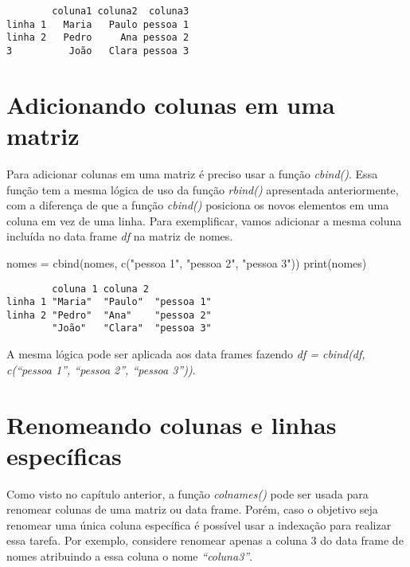 \documentclass[
  letterpaper,
  DIV=11,
  numbers=noendperiod]{scrreprt}
\newenvironment{Shaded}{\begin{snugshade}}{\end{snugshade}}
\newcommand{\FunctionTok}[1]{\textcolor[rgb]{0.28,0.35,0.67}{#1}}
\newcommand{\NormalTok}[1]{\textcolor[rgb]{0.00,0.23,0.31}{#1}}
\newcommand{\OtherTok}[1]{\textcolor[rgb]{0.00,0.23,0.31}{#1}}
\newcommand{\StringTok}[1]{\textcolor[rgb]{0.13,0.47,0.30}{#1}}
\begin{document}
\begin{verbatim}
        coluna1 coluna2  coluna3
linha 1   Maria   Paulo pessoa 1
linha 2   Pedro     Ana pessoa 2
3          João   Clara pessoa 3
\end{verbatim}

\section{Adicionando colunas em uma
matriz}\label{adicionando-colunas-em-uma-matriz}

Para adicionar colunas em uma matriz é preciso usar a função
\emph{cbind()}. Essa função tem a mesma lógica de uso da função
\emph{rbind()} apresentada anteriormente, com a diferença de que a
função \emph{cbind()} posiciona os novos elementos em uma coluna em vez
de uma linha. Para exemplificar, vamos adicionar a mesma coluna incluída
no data frame \emph{df} na matriz de nomes.

\begin{Shaded}
\begin{Highlighting}[]
\NormalTok{nomes }\OtherTok{=} \FunctionTok{cbind}\NormalTok{(nomes, }\FunctionTok{c}\NormalTok{(}\StringTok{"pessoa 1"}\NormalTok{, }\StringTok{"pessoa 2"}\NormalTok{, }\StringTok{"pessoa 3"}\NormalTok{))}
\FunctionTok{print}\NormalTok{(nomes)}
\end{Highlighting}
\end{Shaded}

\begin{verbatim}
        coluna 1 coluna 2           
linha 1 "Maria"  "Paulo"  "pessoa 1"
linha 2 "Pedro"  "Ana"    "pessoa 2"
        "João"   "Clara"  "pessoa 3"
\end{verbatim}

A mesma lógica pode ser aplicada aos data frames fazendo \emph{df =
cbind(df, c(``pessoa 1'', ``pessoa 2'', ``pessoa 3''))}.

\section{Renomeando colunas e linhas
específicas}\label{renomeando-colunas-e-linhas-especuxedficas}

Como visto no capítulo anterior, a função \emph{colnames()} pode ser
usada para renomear colunas de uma matriz ou data frame. Porém, caso o
objetivo seja renomear uma única coluna específica é possível usar a
indexação para realizar essa tarefa. Por exemplo, considere renomear
apenas a coluna 3 do data frame de nomes atribuindo a essa coluna o nome
\emph{``coluna3''}.
\end{document}
